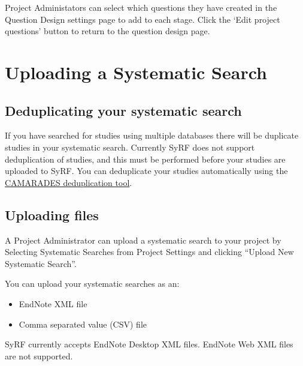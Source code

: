\documentclass[
]{book}
\providecommand{\tightlist}{%
  \setlength{\itemsep}{0pt}\setlength{\parskip}{0pt}}
\begin{document}
Project Administators can select which questions they have created in the Question Design settings page to add to each stage. Click the `Edit project questions' button to return to the question design page.

\hypertarget{systematicSearch}{%
\chapter{Uploading a Systematic Search}\label{systematicSearch}}

\hypertarget{deduplicating-your-systematic-search}{%
\section{Deduplicating your systematic search}\label{deduplicating-your-systematic-search}}

If you have searched for studies using multiple databases there will be duplicate studies in your systematic search. Currently SyRF does not support deduplication of studies, and this must be performed before your studies are uploaded to SyRF. You can deduplicate your studies automatically using the \href{https://camarades.shinyapps.io/RDedup/}{CAMARADES deduplication tool}.

\hypertarget{uploading-files}{%
\section{Uploading files}\label{uploading-files}}

A Project Administrator can upload a systematic search to your project by Selecting Systematic Searches from Project Settings and clicking ``Upload New Systematic Search''.

You can upload your systematic searches as an:

\begin{itemize}
\tightlist
\item
  EndNote XML file
\item
  Comma separated value (CSV) file
\end{itemize}

SyRF currently accepts EndNote Desktop XML files. EndNote Web XML files are not supported.
\end{document}
